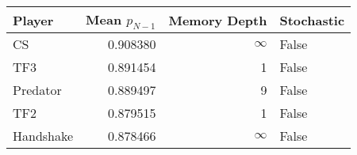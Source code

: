 \begin{tabular}{lrrl}
\toprule
    Player &  Mean $p_{N-1}$ &  Memory Depth & Stochastic \\
\midrule
        CS &        0.908380 &            \(\infty\) &      False \\
       TF3 &        0.891454 &             1 &      False \\
  Predator &        0.889497 &             9 &      False \\
       TF2 &        0.879515 &             1 &      False \\
 Handshake &        0.878466 &            \(\infty\) &      False \\
\bottomrule
\end{tabular}
